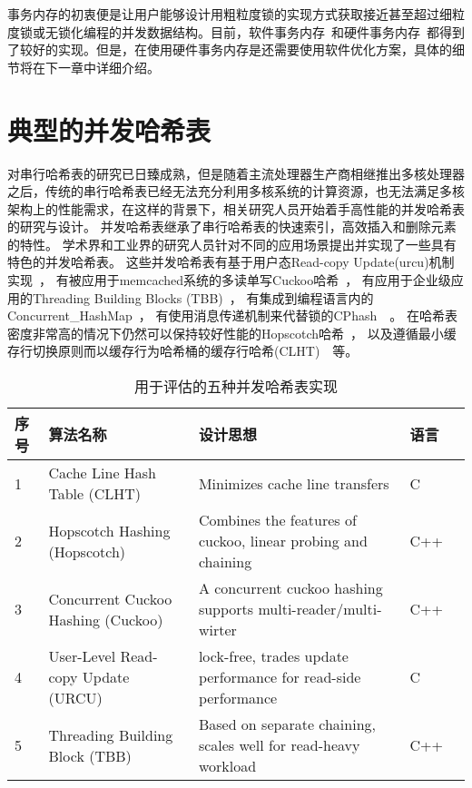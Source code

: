 事务内存的初衷便是让用户能够设计用粗粒度锁的实现方式获取接近甚至超过细粒度锁或无锁化编程的并发数据结构。目前，软件事务内存~\cite{todo}和硬件事务内存~\cite{todo}都得到了较好的实现。但是，在使用硬件事务内存是还需要使用软件优化方案，具体的细节将在下一章中详细介绍。


\section{典型的并发哈希表}

对串行哈希表的研究已日臻成熟，但是随着主流处理器生产商相继推出多核处理器之后，传统的串行哈希表已经无法充分利用多核系统的计算资源，也无法满足多核架构上的性能需求，在这样的背景下，相关研究人员开始着手高性能的并发哈希表的研究与设计。
并发哈希表继承了串行哈希表的快速索引，高效插入和删除元素的特性。
学术界和工业界的研究人员针对不同的应用场景提出并实现了一些具有特色的并发哈希表。
这些并发哈希表有基于用户态Read-copy Update(urcu)机制实现~\cite{urcu}，
有被应用于memcached系统的多读单写Cuckoo哈希~\cite{memc3}，
有应用于企业级应用的Threading Building Blocks (TBB)~\cite{tbb}，
有集成到编程语言内的Concurrent\_HashMap~\cite{oracle}，
有使用消息传递机制来代替锁的CPhash~\cite{metreveli2012cphash}~。
在哈希表密度非常高的情况下仍然可以保持较好性能的Hopscotch哈希~\cite{hopscotch}，
以及遵循最小缓存行切换原则而以缓存行为哈希桶的缓存行哈希(CLHT)~\cite{clht}~等。

\begin{table}[htbp]
  \caption{用于评估的五种并发哈希表实现}
\label{tab:concurrent_hash}
\footnotesize
\centering
\begin{tabular}{lllll}
\toprule
序号 &   算法名称   &   设计思想     &   语言\\
\midrule
1  &  Cache Line Hash Table (CLHT)   &  Minimizes cache line transfers \cite{clht} &   C\\

2  &  Hopscotch Hashing (Hopscotch)   &  Combines the features of cuckoo, linear probing and chaining \cite{hopscotch}     &   C++ \\

3  &   Concurrent Cuckoo Hashing (Cuckoo)   &  A concurrent cuckoo hashing supports multi-reader/multi-wirter \cite{cuckoo}  &   C++ \\

4  &   User-Level Read-copy Update (URCU)   &   lock-free, trades update performance for read-side performance \cite{urcu}   &   C \\

5  &   Threading Building Block (TBB)   &   Based on separate chaining, scales well for read-heavy workload \cite{tbb}        &   C++ \\
\bottomrule
\end{tabular}
\end{table}

